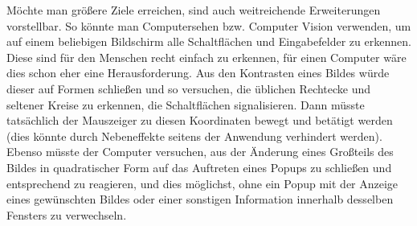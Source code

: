 Möchte man größere Ziele erreichen, sind auch weitreichende
Erweiterungen vorstellbar. So könnte man Computersehen bzw.
Computer Vision verwenden, um auf einem beliebigen Bildschirm
alle Schaltflächen und Eingabefelder zu erkennen. Diese sind
für den Menschen recht einfach zu erkennen, für einen
Computer wäre dies schon eher eine Herausforderung. Aus den
Kontrasten eines Bildes würde dieser auf Formen schließen
und so versuchen, die üblichen Rechtecke und seltener Kreise
zu erkennen, die Schaltflächen signalisieren. Dann müsste
tatsächlich der Mauszeiger zu diesen Koordinaten bewegt
und betätigt werden (dies könnte durch Nebeneffekte seitens
der Anwendung verhindert werden). Ebenso müsste der Computer
versuchen, aus der Änderung eines Großteils des Bildes
in quadratischer Form auf das Auftreten eines Popups zu 
schließen und entsprechend zu reagieren, und dies möglichst,
ohne ein Popup mit der Anzeige eines gewünschten Bildes
oder einer sonstigen Information innerhalb desselben
Fensters zu verwechseln.
